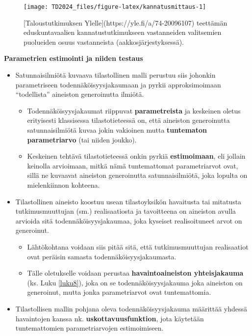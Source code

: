 \documentclass[
]{book}
\providecommand{\tightlist}{%
  \setlength{\itemsep}{0pt}\setlength{\parskip}{0pt}}
\begin{document}
\begin{figure}

{\centering \texttt{[image: TD2024\_files/figure-latex/kannatusmittaus-1]} 

}

\caption{[Taloustutkimuksen Ylelle](https://yle.fi/a/74-20096107) teettämän eduskuntavaalien kannatustutkimukseen vastanneiden valitsemien puolueiden osuus vastanneista (aakkosjärjestyksessä).}\label{fig:kannatusmittaus}
\end{figure}

\textbf{Parametrien estimointi ja niiden testaus}

\begin{itemize}
\tightlist
\item
  Satunnaisilmiötä kuvaava tilastollinen malli perustuu siis johonkin parametriseen todennäköisyysjakaumaan ja pyrkii approksimoimaan ``todellista'' aineiston generoinutta ilmiötä.

  \begin{itemize}
  \tightlist
  \item
    Todennäköisyysjakaumat riippuvat \textbf{parametreista} ja keskeinen oletus erityisesti klassisessa tilastotieteessä on, että aineiston generoinutta satunnaisilmiötä kuvaa jokin vakioinen mutta \textbf{tuntematon parametriarvo} (tai niiden joukko).
  \item
    Keskeinen tehtävä tilastotieteessä onkin pyrkiä \textbf{estimoimaan}, eli jollain keinolla arvioimaan, mitkä nämä tuntemattomat parametriarvot ovat, sillä ne kuvaavat aineiston generoinutta satunnaisilmiötä, joka lopulta on mielenkiinnon kohteena.
  \end{itemize}
\item
  Tilastollinen aineisto koostuu usean tilastoyksikön havaitusta tai mitatusta tutkimusmuuttujan (sm.) realisaatiosta ja tavoitteena on aineiston avulla arvioida sitä todennäköisyysjakaumaa, joka kyseiset realisoituneet arvot on generoinut.

  \begin{itemize}
  \tightlist
  \item
    Lähtökohtana voidaan siis pitää sitä, että tutkimusmuuttujan realisaatiot ovat peräisin samasta todennäköisyysjakaumasta.
  \item
    Tälle oletukselle voidaan perustaa \textbf{havaintoaineiston yhteisjakauma} (ks. Luku \ref{luku8}), joka on se todennäköisyysjakauma joka aineiston on generoinut, mutta jonka parametriarvot ovat tuntemattomia.
  \end{itemize}
\item
  Tilastollisen mallin pohjana oleva todennäköisyysjakauma määrittää yhdessä havaintojen kanssa nk. \textbf{uskottavuusfunktion}, jota käytetään tuntemattomien parametriarvojen estimoimiseen.


\end{itemize}
\end{document}
